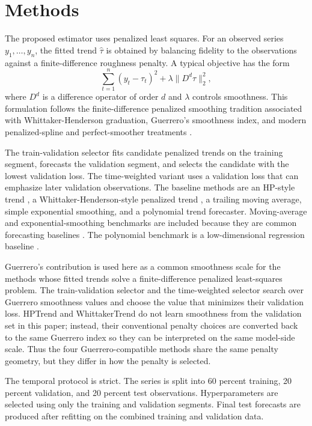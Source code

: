 \section{Methods}
The proposed estimator uses penalized least squares. For an observed series
$y_1,\ldots,y_n$, the fitted trend $\hat{\tau}$ is obtained by balancing
fidelity to the observations against a finite-difference roughness penalty. A
typical objective has the form
\[
  \sum_{t=1}^n (y_t-\tau_t)^2 + \lambda \|D^d \tau\|_2^2,
\]
where $D^d$ is a difference operator of order $d$ and $\lambda$ controls
smoothness. This formulation follows the finite-difference penalized smoothing
tradition associated with Whittaker-Henderson graduation, Guerrero's
smoothness index, and modern penalized-spline and perfect-smoother treatments
\citep{whittaker1922graduation,henderson1924graduation,
guerrero2007penalized,eilers1996psplines,eilers2003perfect,wahba1990splines}.

The train-validation selector fits candidate penalized trends on the training
segment, forecasts the validation segment, and selects the candidate with the
lowest validation loss. The time-weighted variant uses a validation loss that
can emphasize later validation observations. The baseline methods are an
HP-style trend \citep{hodrick1997business,king1993lowfrequency}, a
Whittaker-Henderson-style penalized trend
\citep{whittaker1922graduation,henderson1924graduation}, a trailing moving
average, simple exponential smoothing, and a polynomial trend forecaster.
Moving-average and exponential-smoothing benchmarks are included because they
are common forecasting baselines \citep{brown1959forecasting,holt2004exponential,
winters1960forecasting,gardner1985exponential,gardner2006exponential,
hyndman2008exponential}. The polynomial benchmark is a low-dimensional
regression baseline \citep{draper1998regression}.

Guerrero's contribution is used here as a common smoothness scale for the
methods whose fitted trends solve a finite-difference penalized least-squares
problem. The train-validation selector and the time-weighted selector search
over Guerrero smoothness values and choose the value that minimizes their
validation loss. HPTrend and WhittakerTrend do not learn smoothness from the
validation set in this paper; instead, their conventional penalty choices are
converted back to the same Guerrero index so they can be interpreted on the
same model-side scale. Thus the four Guerrero-compatible methods share the
same penalty geometry, but they differ in how the penalty is selected.

The temporal protocol is strict. The series is split into 60 percent training,
20 percent validation, and 20 percent test observations. Hyperparameters are
selected using only the training and validation segments. Final test forecasts
are produced after refitting on the combined training and validation data.
